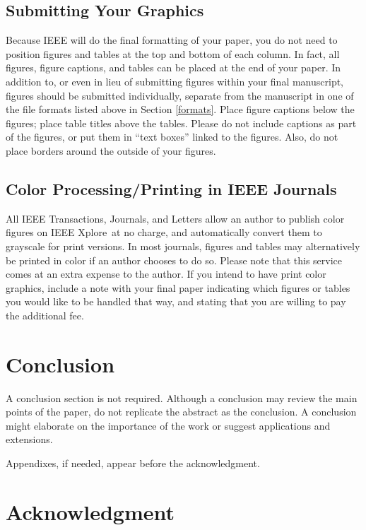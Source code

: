 \documentclass[twoside,web]{ieeecolor}
\begin{document}
\subsection{Submitting Your Graphics}
Because IEEE will do the final formatting of your paper,
you do not need to position figures and tables at the top and bottom of each 
column. In fact, all figures, figure captions, and tables can be placed at 
the end of your paper. In addition to, or even in lieu of submitting figures 
within your final manuscript, figures should be submitted individually, 
separate from the manuscript in one of the file formats listed above in 
Section \ref{formats}. Place figure captions below the figures; place table titles 
above the tables. Please do not include captions as part of the figures, or 
put them in ``text boxes'' linked to the figures. Also, do not place borders 
around the outside of your figures.

\subsection{Color Processing/Printing in IEEE Journals}
All IEEE Transactions, Journals, and Letters allow an author to publish 
color figures on IEEE Xplore\textregistered\ at no charge, and automatically 
convert them to grayscale for print versions. In most journals, figures and 
tables may alternatively be printed in color if an author chooses to do so. 
Please note that this service comes at an extra expense to the author. If 
you intend to have print color graphics, include a note with your final 
paper indicating which figures or tables you would like to be handled that 
way, and stating that you are willing to pay the additional fee.

\section{Conclusion}
A conclusion section is not required. Although a conclusion may review the 
main points of the paper, do not replicate the abstract as the conclusion. A 
conclusion might elaborate on the importance of the work or suggest 
applications and extensions. 

\appendices

Appendixes, if needed, appear before the acknowledgment.

\section*{Acknowledgment}
\end{document}
